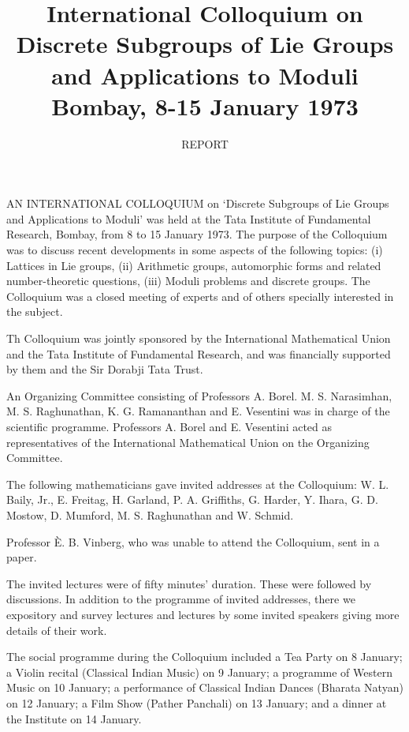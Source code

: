 \title{International Colloquium on Discrete Subgroups of Lie Groups and Applications to Moduli
\break
{\fontsize{13}{15}\selectfont Bombay, 8-15 January 1973}}

\author{REPORT}
\date{}
\maketitle

\thispagestyle{empty}

AN INTERNATIONAL  COLLOQUIUM on `Discrete Subgroups of Lie Groups and Applications to Moduli' was held at the Tata Institute of Fundamental Research, Bombay, from 8 to 15 January 1973. The purpose of the Colloquium was to discuss recent developments in some aspects of the following topics: (i) Lattices in Lie groups, (ii) Arithmetic groups, automorphic forms and related number-theoretic questions, (iii)  Moduli problems and discrete groups. The  Colloquium was a closed meeting of experts and of others specially interested in the subject.

\medskip
Th Colloquium was jointly sponsored by the International Mathematical Union and the Tata Institute of Fundamental Research, and was financially supported by them and the Sir Dorabji Tata Trust. 

\medskip
An Organizing Committee consisting of Professors A. Borel. M. S. Narasimhan, M. S. Raghunathan, K. G. Ramananthan and E. Vesentini was in charge of the scientific programme. Professors A. Borel and E. Vesentini acted as representatives of the International Mathematical Union on the Organizing Committee.

\medskip
The following mathematicians gave invited addresses at the Colloquium: W. L. Baily, Jr., E. Freitag, H. Garland, P. A. Griffiths, G. Harder, Y. Ihara, G. D. Mostow, D. Mumford, M. S. Raghunathan and W. Schmid.

\medskip

Professor \`E. B. Vinberg, who was unable to attend the Colloquium, sent in a paper.

\medskip
The invited lectures were of fifty minutes' duration. These were followed by discussions. In addition to the programme of invited addresses, there we expository and survey lectures and lectures by some invited speakers giving more details of their work.

\medskip
The social programme during the Colloquium included a Tea Party on 8 January; a Violin recital (Classical Indian Music) on 9 January; a programme of Western Music on 10 January; a performance of Classical Indian Dances (Bharata Natyan) on 12 January; a Film Show (Pather Panchali) on 13 January; and a dinner at the Institute on 14 January.

\lhead[]{}

\vfill\eject
